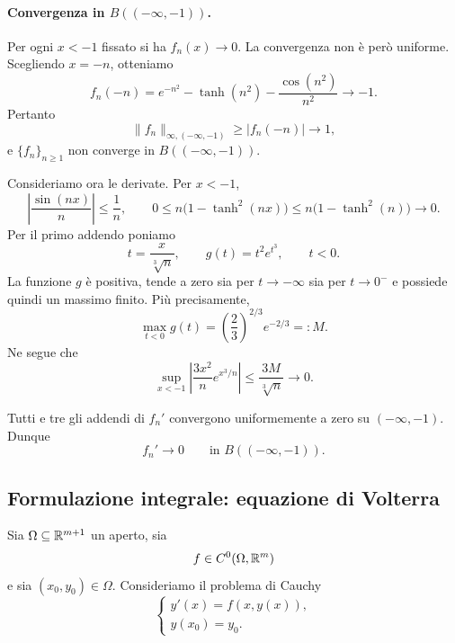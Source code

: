 \documentclass[a4paper]{article}
\begin{document}
\begin{radioactive}
\begin{snippetsolution}{}
\paragraph{Convergenza in \(B(({-\infty},-1))\).}
Per ogni \(x<-1\) fissato si ha \(f_n(x)\to0\). La convergenza non è però uniforme. Scegliendo \(x=-n\), otteniamo
\[
	f_n(-n)=e^{-n^2}-\tanh(n^2)-\frac{\cos(n^2)}{n^2}
	\longrightarrow -1.
\]
Pertanto
\[
	\lVert f_n\rVert_{\infty,({-\infty},-1)}
	\geq |f_n(-n)|\longrightarrow 1,
\]
e \(\{f_n\}_{n\geq1}\) non converge in \(B(({-\infty},-1))\).

Consideriamo ora le derivate. Per \(x<-1\),
\[
	\left|\frac{\sin(nx)}{n}\right|\leq\frac1n,
	\qquad
	0\leq n\bigl(1-\tanh^2(nx)\bigr)
	\leq n\bigl(1-\tanh^2(n)\bigr)\longrightarrow0.
\]
Per il primo addendo poniamo
\[
	t=\frac{x}{\sqrt[3]{n}},
	\qquad
	g(t)=t^2e^{t^3},
	\qquad t<0.
\]
La funzione \(g\) è positiva, tende a zero sia per \(t\to-\infty\) sia per \(t\to0^-\) e possiede quindi un massimo finito. Più precisamente,
\[
	\max_{t<0}g(t)=\left(\frac23\right)^{2/3}e^{-2/3}=:M.
\]
Ne segue che
\[
	\sup_{x<-1}\left|\frac{3x^2}{n}e^{x^3/n}\right|
	\leq\frac{3M}{\sqrt[3]{n}}
	\longrightarrow0.
\]

\begin{center}
\end{center}

Tutti e tre gli addendi di \(f_n'\) convergono uniformemente a zero su \(({-\infty},-1)\). Dunque
\[
	f_n'\longrightarrow0
	\qquad\text{in }B(({-\infty},-1)).
\]
\end{snippetsolution}
\end{radioactive}

\subsection{Formulazione integrale: equazione di Volterra}

\begin{radioactive}
Sia \(\Omega\subseteq\mathbb{R}^{m+1}\) un aperto, sia
\[
	f\in C^0(\Omega,\mathbb{R}^m)
\]
e sia \((x_0,y_0)\in\Omega\). Consideriamo il problema di Cauchy
\[
	\tag{C}
	\begin{cases}
		y'(x)=f(x,y(x)),\\
		y(x_0)=y_0.
	\end{cases}
\]
\end{radioactive}
\end{document}
